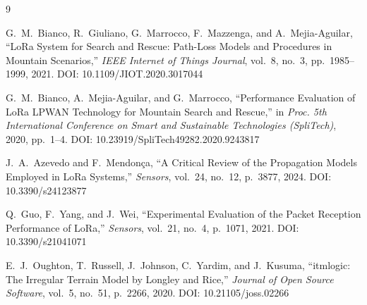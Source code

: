 \documentclass[11pt,letterpaper]{article}
\begin{document}
\begin{thebibliography}{9}

G.\ M.\ Bianco, R.\ Giuliano, G.\ Marrocco, F.\ Mazzenga, and A.\ Mejia-Aguilar,
``LoRa System for Search and Rescue: Path-Loss Models and Procedures in Mountain
Scenarios,''
\textit{IEEE Internet of Things Journal}, vol.\ 8, no.\ 3, pp.\ 1985--1999, 2021.
DOI: 10.1109/JIOT.2020.3017044

G.\ M.\ Bianco, A.\ Mejia-Aguilar, and G.\ Marrocco,
``Performance Evaluation of LoRa LPWAN Technology for Mountain Search and Rescue,''
in \textit{Proc. 5th International Conference on Smart and Sustainable Technologies
(SpliTech)}, 2020, pp.\ 1--4.
DOI: 10.23919/SpliTech49282.2020.9243817

J.~A.\ Azevedo and F.\ Mendonça,
``A Critical Review of the Propagation Models Employed in LoRa Systems,''
\textit{Sensors}, vol.~24, no.~12, p.~3877, 2024.
DOI: 10.3390/s24123877

Q.\ Guo, F.\ Yang, and J.\ Wei,
``Experimental Evaluation of the Packet Reception Performance of LoRa,''
\textit{Sensors}, vol.~21, no.~4, p.~1071, 2021.
DOI: 10.3390/s21041071

E.~J.\ Oughton, T.~Russell, J.~Johnson, C.~Yardim, and J.~Kusuma,
``itmlogic: The Irregular Terrain Model by Longley and Rice,''
\textit{Journal of Open Source Software}, vol.~5, no.~51, p.~2266, 2020.
DOI: 10.21105/joss.02266

\end{thebibliography}
\end{document}
